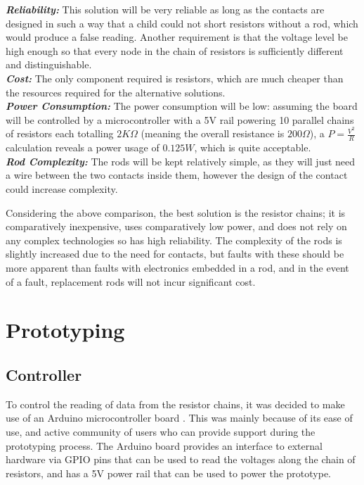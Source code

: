 {
\setlength{\parindent}{0pt} 

\textbf{\textit{Reliability:}} This solution will be very reliable as long as the contacts are designed in such a way that a child could not short resistors without a rod, which would produce a false reading. Another requirement is that the voltage level be high enough so that every node in the chain of resistors is sufficiently different and distinguishable.\\

\textbf{\textit{Cost:}} The only component required is resistors, which are much cheaper \cite{CFR25J1024:online} than the resources required for the alternative solutions.\\

\textbf{\textit{Power Consumption:}} The power consumption will be low: assuming the board will be controlled by a microcontroller with a 5V rail powering 10 parallel chains of resistors each totalling $2K\Omega$ (meaning the overall resistance is $200\Omega$), a $P=\frac{V^2}{R}$ calculation reveals a power usage of $0.125W$, which is quite acceptable.  \\

\textbf{\textit{Rod Complexity:}} The rods will be kept relatively simple, as they will just need a wire between the two contacts inside them, however the design of the contact could increase complexity.\\
}




Considering the above comparison, the best solution is the resistor chains; it is comparatively inexpensive, uses comparatively low power, and does not rely on any complex technologies so has high reliability. The complexity of the rods is slightly increased due to the need for contacts, but faults with these should be more apparent than faults with electronics embedded in a rod, and in the event of a fault, replacement rods will not incur significant cost.


\section{Prototyping}

\subsection{Controller}
To control the reading of data from the resistor chains, it was decided to make use of an Arduino microcontroller board \cite{ArduinoH73:online}. This was mainly because of its ease of use, and active community of users who can provide support during the prototyping process. The Arduino board provides an interface to external hardware via GPIO pins that can be used to read the voltages along the chain of resistors, and has a 5V power rail that can be used to power the prototype. 

